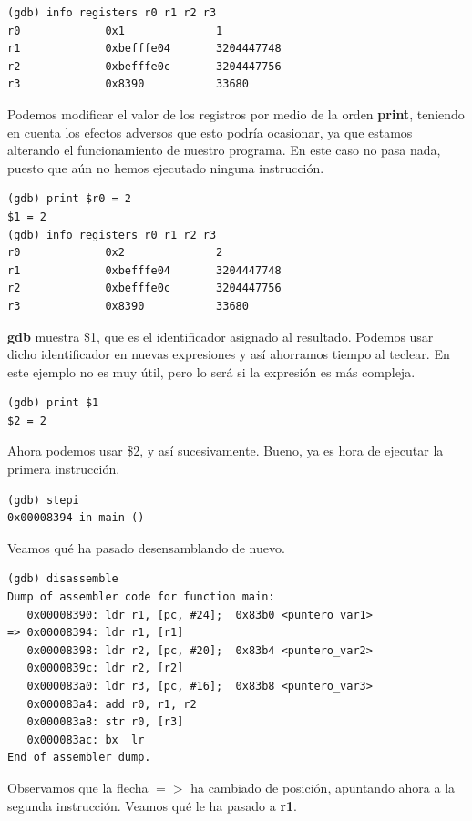 \newpage
\begin{lstlisting}
(gdb) info registers r0 r1 r2 r3
r0             0x1              1
r1             0xbefffe04       3204447748
r2             0xbefffe0c       3204447756
r3             0x8390           33680
\end{lstlisting}

Podemos modificar el valor de los registros por medio de la orden
{\bf print}, teniendo en cuenta los efectos adversos que esto podría
ocasionar, ya que estamos alterando el funcionamiento de nuestro
programa. En este caso no pasa nada, puesto que aún no hemos ejecutado
ninguna instrucción.

\begin{lstlisting}
(gdb) print $r0 = 2
$1 = 2
(gdb) info registers r0 r1 r2 r3
r0             0x2              2
r1             0xbefffe04       3204447748
r2             0xbefffe0c       3204447756
r3             0x8390           33680
\end{lstlisting}

{\bf gdb} muestra \$1, que es el identificador asignado al resultado. Podemos
usar dicho identificador en nuevas expresiones y así ahorramos tiempo al teclear.
En este ejemplo no es muy útil, pero lo será si la expresión es más compleja.

\begin{lstlisting}
(gdb) print $1
$2 = 2
\end{lstlisting}

Ahora podemos usar \$2, y así sucesivamente. Bueno, ya es hora de ejecutar la primera
instrucción.

\begin{lstlisting}
(gdb) stepi
0x00008394 in main ()
\end{lstlisting}

Veamos qué ha pasado desensamblando de nuevo.

\begin{lstlisting}
(gdb) disassemble
Dump of assembler code for function main:
   0x00008390: ldr r1, [pc, #24];  0x83b0 <puntero_var1>
=> 0x00008394: ldr r1, [r1]
   0x00008398: ldr r2, [pc, #20];  0x83b4 <puntero_var2>
   0x0000839c: ldr r2, [r2]
   0x000083a0: ldr r3, [pc, #16];  0x83b8 <puntero_var3>
   0x000083a4: add r0, r1, r2
   0x000083a8: str r0, [r3]
   0x000083ac: bx  lr
End of assembler dump.
\end{lstlisting}

Observamos que la flecha {\bf $=>$} ha cambiado de posición, apuntando ahora
a la segunda instrucción. Veamos qué le ha pasado a {\bf r1}.

